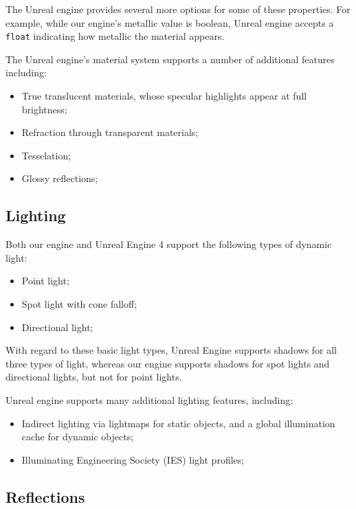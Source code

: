 \documentclass[11pt]{scrartcl} %
\newcommand{\code}[1]{{\texttt{#1}}}
\begin{document}
        The Unreal engine provides several more options for some of these
        properties. For example, while our engine's metallic value is boolean,
        Unreal engine accepts a \code{float} indicating how metallic the
        material appears.

        The Unreal engine's material system supports a number of additional
        features including:

        \begin{itemize}
            \item True translucent materials, whose specular highlights appear at full brightness;
            \item Refraction through transparent materials;
            \item Tesselation;
            \item Glossy reflections;
        \end{itemize}

    \subsection{Lighting}

        Both our engine and Unreal Engine 4 support the following types of
        dynamic light:

        \begin{itemize}
            \item Point light;
            \item Spot light with cone falloff;
            \item Directional light;
        \end{itemize}

        With regard to these basic light types, Unreal Engine supports shadows
        for all three types of light, whereas our engine supports shadows for
        spot lights and directional lights, but not for point lights.

        Unreal engine supports many additional lighting features, including:

        \begin{itemize}
            \item Indirect lighting via lightmaps for static objects, and a global illumination cache for dynamic objects;
            \item Illuminating Engineering Society (IES) light profiles;
        \end{itemize}

    \subsection{Reflections}
\end{document}
